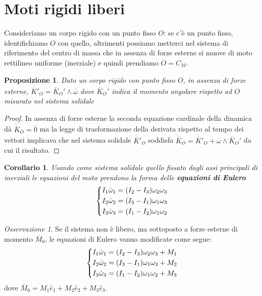 \documentclass{book}
\theoremstyle{plain}
\theoremstyle{plain}
\theoremstyle{plain}
\theoremstyle{plain}
\newtheorem*{cor}{Corollario}
\theoremstyle{plain}
\newtheorem{prop}{Proposizione}[chapter]
\theoremstyle{definition}
\theoremstyle{remark}
\newtheorem*{oss}{Osservazione}
\theoremstyle{definition}
\begin{document}
\section{Moti rigidi liberi}

Consideriamo un corpo rigido con un punto fisso $O$: se c'è un punto fisso, identifichiamo $O$ con quello, altrimenti possiamo metterci nel sistema di riferimento del centro di massa che in assenza di forze esterne si muove di moto rettilineo uniforme (inerziale) e quindi prendiamo $O=C_M$.

\begin{prop}
    Dato un corpo rigido con punto fisso $O$, in assenza di forze esterne, $\dot{\overline{K}'}_O=\overline{K}_O'\wedge\overline{\omega}$ dove $\overline{K}_O'$ indica il momento angolare rispetto ad $O$ misurato nel sistema solidale
\end{prop}

\begin{proof}
    In assenza di forze esterne la seconda equazione cardinale della dinamica dà $\Dot{\overline{K}}_O=\overline{0}$ ma la legge di trasformazione della derivata rispetto al tempo dei vettori implicava che nel sistema solidale $\Dot{\overline{K}'}_O$ soddisfa $\Dot{\overline{K}}_O=\Dot{\overline{K}'}_O+\overline{\omega}\wedge\overline{K}_O'$ da cui il risultato.
\end{proof}

\begin{cor}
    Usando come sistema solidale quello fissato dagli assi principali di inerziali le equazioni del moto prendono la forma delle \textbf{equazioni di Eulero}
    \begin{displaymath}
        \begin{dcases}
        I_1\dot{\omega}_1=(I_2-I_3)\omega_2\omega_3 \\
        I_2\dot{\omega}_2=(I_3-I_1)\omega_1\omega_3\\
        I_3\dot{\omega}_3=(I_1-I_2)\omega_1\omega_2
    \end{dcases}
    \end{displaymath}
\end{cor}

\begin{oss}
    Se il sistema non è libero, ma sottoposto a forze esterne di momento $\overline{M}_0$, le equazioni di Eulero vanno modificate come segue:
    \begin{displaymath}
        \begin{dcases}
            I_1\dot{\omega}_1=(I_2-I_3)\omega_2\omega_3 + M_1 \\
            I_2\dot{\omega}_2=(I_3-I_1)\omega_1\omega_3 +M_2\\
            I_3\dot{\omega}_3=(I_1-I_2)\omega_1\omega_2 +M_3
        \end{dcases}
    \end{displaymath}
    dove $\overline{M}_0=M_1\hat{e}_1+M_2\hat{e}_2+M_3\hat{e}_3$.
\end{oss}
\end{document}
